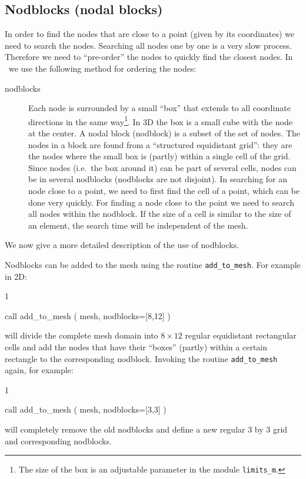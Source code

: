 \subsection{Nodblocks (nodal blocks)}
\label{sec:nodblocks}

In order to find the nodes that are close to a point (given by its
coordinates) we need to search the nodes. Searching all nodes one by one
is a very slow process. Therefore we need to ``pre-order'' the nodes to
quickly find the closest nodes.
In \tfem\ we use the following method for ordering the nodes:
\begin{description}
   \item[nodblocks] Each node is surrounded by a small ``box'' that 
      extends to all coordinate directions in the same
      way\footnote{The size of the box is an adjustable parameter in the module
      \texttt{limits\_m}.}.
      In 3D the box is a small
      cube with the node at the center.
      A nodal block (nodblock) is a subset of the set of
      nodes. The nodes in a block are found from a ``structured
      equidistant grid'': they are the nodes where the small box
      is (partly) within a single cell of the grid.
      Since nodes (i.e.\ the box around it) can be part of several cells,
      nodes can be in several nodblocks (nodblocks are not disjoint).
      In searching for an node close to a point,
      we need to first find the cell of a point,
      which can be done very quickly. For finding a node close to the point 
      we need to search all nodes within the nodblock. If the size of a cell 
      is similar to the size of an element, the search time will be independent
      of the mesh.
\end{description}

We now give a more detailed description of the use of nodblocks.

Nodblocks can be added to the mesh
using the routine \texttt{add\_to\_mesh}. For example in 2D:
\begin{listing}{1}

  call add_to_mesh ( mesh, nodblocks=[8,12] )

\end{listing}
will divide the complete mesh domain into $8\times12$ regular equidistant
rectangular cells and add the
nodes that have their ``boxes'' (partly) within a certain rectangle
to the corresponding
nodblock. Invoking the routine \texttt{add\_to\_mesh} again, for example:
\begin{listing}{1}

  call add_to_mesh ( mesh, nodblocks=[3,3] )

\end{listing}
will completely remove the old nodblocks and define a new regular 3 by 3 grid
and corresponding nodblocks.

